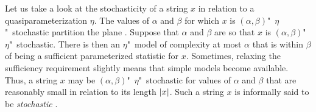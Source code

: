 Let us take a look at the stochasticity of a string $x$ in relation to a quasiparameterization $\eta$.
The values of $\alpha$ and $\beta$ for which $x$ is $(\alpha, \beta)$"~$\eta$"~stochastic partition the plane \parencite{vereshchagin2004kolmogorov,gacs2001algorithmic}.
Suppose that $\alpha$ and $\beta$ are so that $x$ is $(\alpha, \beta)$"~$\eta$"~stochastic.
There is then an $\eta$"~model of complexity at most $\alpha$ that is within $\beta$ of being a sufficient parameterized statistic for $x$.
Sometimes, relaxing the sufficiency requirement slightly means that simple models become available.
Thus, a string $x$ may be $(\alpha, \beta)$"~$\eta$"~stochastic for values of $\alpha$ and $\beta$ that are reasonably small in relation to its length ${\lvert x\rvert}$.
Such a string $x$ is informally said to be \emph{stochastic} \parencite{vereshchagin2017algorithmic}.

